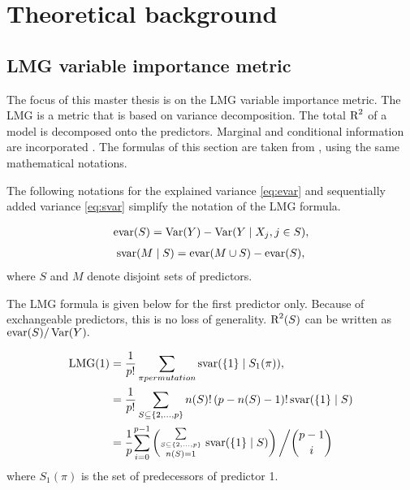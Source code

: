 \documentclass[11pt,a4paper,twoside]{book}
\begin{document}








\chapter{Theoretical background} 

\section{LMG variable importance metric}

The focus of this master thesis is on the LMG variable importance metric. The LMG is a metric that is based on variance decomposition. The total $\text{R}^2$ of a model is decomposed onto the predictors. Marginal and conditional information are incorporated \citep{Gromping2015} .  The  formulas of this section are taken from \cite{Gromping2015}, using the same mathematical notations. 

The following notations for the explained variance \eqref{eq:evar} and sequentially added variance \eqref{eq:svar} simplify the notation of the LMG formula. 

   \begin{align} 
     \text{evar}(S) = \operatorname{Var}(Y) - \operatorname{Var}( Y \mid X_{j}, j \in S),   \label{eq:evar} 
   \end{align} 
   \begin{align} 
     \text{svar}(M \mid S) = \text{evar}(M \cup S) - \text{evar}(S), \label{eq:svar} 
    \end{align} where $S$ and $M$ denote disjoint sets of predictors.
    
   The LMG formula is given below for the first predictor only. Because of exchangeable predictors, this is no loss of generality.  $\text{R}^2(S)$ can be written as $\text{evar}(S)/\operatorname{Var}(Y).$ 

   \begin{align} 
     \text{LMG}(1) &= \frac{1}{p!} \sum_{\pi permutation}^{} \text{svar}(\{1\} \mid S_{1}(\pi)),   \label{eq:lmgw1}  \\
     &= \frac{1}{p!} \sum_{S \subseteq \{ 2, \dots, p \} }^{} n(S)! \, (p-n(S)-1)! \, \text{svar}(\{1\} \mid S) \label{eq:lmgw2}  \\
     &=  \cfrac{1}{p} \sum_{i=0}^{p-1} \left( \substack {\sum\limits_{ S \subseteq \{ 2, \dots, p \}}\\n(S)=1}^{} \ \text{svar}(\{1\} \mid S)\right)\bigg/ \binom{p-1}{i}  \label{eq:lmgw3}
   \end{align}
   where $S_{1}(\pi)$ is the set of predecessors of predictor 1.
   
\end{document}
